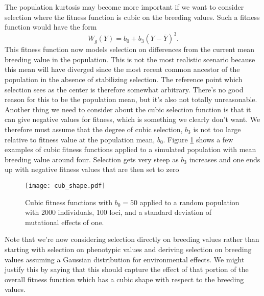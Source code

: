 The population kurtosis may become more important if we want to consider
selection where the fitness function is cubic on the breeding values. Such a
fitness function would have the form
\begin{equation}
  \label{eq:cubsel}
  W_g(Y) = b_0 + b_3(Y-\bar{Y})^3.
\end{equation}
This fitness function now models selection on differences from the current mean
breeding value in the population. This is not the most realistic scenario
because this mean will have diverged since the most recent common ancestor of
the population in the absence of stabilizing selection. The reference point
which selection sees as the center is therefore somewhat arbitrary. There's no
good reason for this to be the population mean, but it's also not totally
unreasonable. Another thing we need to consider about the cubic selection
function is that it can give negative values for fitness, which is something we
clearly don't want. We therefore must assume that the degree of cubic selection,
$b_3$ is not too large relative to fitness value at the population mean, $b_0$.
Figure \ref{fig:cubshape} shows a few examples of cubic fitness functions
applied to a simulated population with mean breeding value around four.
Selection gets very steep as $b_3$ increases and one ends up with negative
fitness values that are then set to zero

\begin{figure}
  \centering
  \texttt{[image: cub\_shape.pdf]}
  \caption{Cubic fitness functions with $b_0=50$ applied to a random population
    with 2000 individuals, 100 loci, and a standard deviation of mutational
    effects of one.}
  \label{fig:cubshape}
\end{figure}

Note that we're now considering selection directly on breeding values rather
than starting with selection on phenotypic values and deriving selection on
breeding values assuming a Gaussian distribution for environmental effects. We
might justify this by saying that this should capture the effect of that portion
of the overall fitness function which has a cubic shape with respect to the
breeding values.

